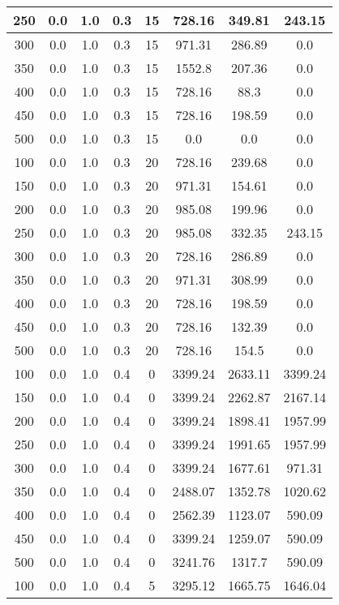 \documentclass[a4paper, 12pt]{extreport}
\begin{document}
\begin{itemize}
\begin{longtable}{|c|c|c|c|c|c|c|c|}
			250 & 0.0 & 1.0 & 0.3 & 15 & 728.16 & 349.81 & 243.15 \\\hline
			300 & 0.0 & 1.0 & 0.3 & 15 & 971.31 & 286.89 & 0.0 \\\hline
			350 & 0.0 & 1.0 & 0.3 & 15 & 1552.8 & 207.36 & 0.0 \\\hline
			400 & 0.0 & 1.0 & 0.3 & 15 & 728.16 & 88.3 & 0.0 \\\hline
			450 & 0.0 & 1.0 & 0.3 & 15 & 728.16 & 198.59 & 0.0 \\\hline
			500 & 0.0 & 1.0 & 0.3 & 15 & 0.0 & 0.0 & 0.0 \\\hline
			100 & 0.0 & 1.0 & 0.3 & 20 & 728.16 & 239.68 & 0.0 \\\hline
			150 & 0.0 & 1.0 & 0.3 & 20 & 971.31 & 154.61 & 0.0 \\\hline
			200 & 0.0 & 1.0 & 0.3 & 20 & 985.08 & 199.96 & 0.0 \\\hline
			250 & 0.0 & 1.0 & 0.3 & 20 & 985.08 & 332.35 & 243.15 \\\hline
			300 & 0.0 & 1.0 & 0.3 & 20 & 728.16 & 286.89 & 0.0 \\\hline
			350 & 0.0 & 1.0 & 0.3 & 20 & 971.31 & 308.99 & 0.0 \\\hline
			400 & 0.0 & 1.0 & 0.3 & 20 & 728.16 & 198.59 & 0.0 \\\hline
			450 & 0.0 & 1.0 & 0.3 & 20 & 728.16 & 132.39 & 0.0 \\\hline
			500 & 0.0 & 1.0 & 0.3 & 20 & 728.16 & 154.5 & 0.0 \\\hline
			100 & 0.0 & 1.0 & 0.4 & 0 & 3399.24 & 2633.11 & 3399.24 \\\hline
			150 & 0.0 & 1.0 & 0.4 & 0 & 3399.24 & 2262.87 & 2167.14 \\\hline
			200 & 0.0 & 1.0 & 0.4 & 0 & 3399.24 & 1898.41 & 1957.99 \\\hline
			250 & 0.0 & 1.0 & 0.4 & 0 & 3399.24 & 1991.65 & 1957.99 \\\hline
			300 & 0.0 & 1.0 & 0.4 & 0 & 3399.24 & 1677.61 & 971.31 \\\hline
			350 & 0.0 & 1.0 & 0.4 & 0 & 2488.07 & 1352.78 & 1020.62 \\\hline
			400 & 0.0 & 1.0 & 0.4 & 0 & 2562.39 & 1123.07 & 590.09 \\\hline
			450 & 0.0 & 1.0 & 0.4 & 0 & 3399.24 & 1259.07 & 590.09 \\\hline
			500 & 0.0 & 1.0 & 0.4 & 0 & 3241.76 & 1317.7 & 590.09 \\\hline
			100 & 0.0 & 1.0 & 0.4 & 5 & 3295.12 & 1665.75 & 1646.04 \\\hline

\end{longtable}
\end{itemize}
\end{document}
